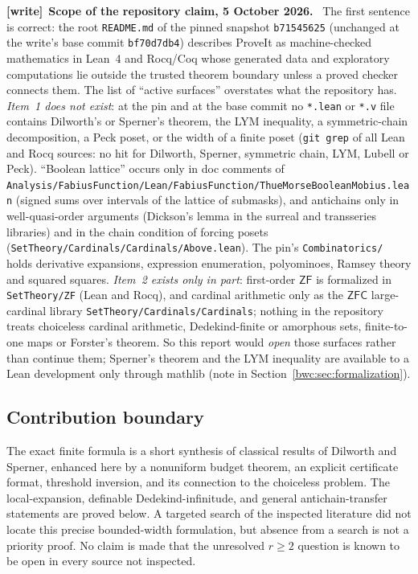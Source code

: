 \documentclass[11pt,letterpaper]{article}
\numberwithin{equation}{section}
\theoremstyle{plain}
\theoremstyle{definition}
\theoremstyle{remark}
\newcommand{\ZF}{\mathsf{ZF}}
\newcommand{\ZFC}{\mathsf{ZFC}}
\newcommand{\file}[1]{\nolinkurl{#1}}
\newenvironment{writenote}[1][]{\par\smallskip\begingroup\small
 \noindent\textbf{[write]}\if\relax\detokenize{#1}\relax\else~\textbf{#1.}\fi\ }%
 {\par\endgroup\smallskip}
\begin{document}
\begin{writenote}[Scope of the repository claim, 5 October 2026]
The first sentence is correct: the root \file{README.md} of the pinned
snapshot \file{b71545625} (unchanged at the write's base commit
\file{bf70d7db4}) describes ProveIt as machine-checked mathematics in Lean~4
and Rocq/Coq whose generated data and exploratory computations lie outside the
trusted theorem boundary unless a proved checker connects them. The list of
``active surfaces'' overstates what the repository has. \emph{Item~1 does not
exist}: at the pin and at the base commit no \file{*.lean} or \file{*.v} file
contains Dilworth's or Sperner's theorem, the LYM inequality, a
symmetric-chain decomposition, a Peck poset, or the width of a finite poset
(\texttt{git grep} of all Lean and Rocq sources: no hit for Dilworth, Sperner,
symmetric chain, LYM, Lubell or Peck). ``Boolean lattice'' occurs only in doc
comments of \file{Analysis/FabiusFunction/Lean/FabiusFunction/ThueMorseBooleanMobius.lean}
(signed sums over intervals of the lattice of submasks), and antichains only
in well-quasi-order arguments (Dickson's lemma in the surreal and transseries
libraries) and in the chain condition of forcing posets
(\file{SetTheory/Cardinals/Cardinals/Above.lean}). The pin's
\file{Combinatorics/} holds derivative expansions, expression enumeration,
polyominoes, Ramsey theory and squared squares. \emph{Item~2 exists only in
part}: first-order $\ZF$ is formalized in \file{SetTheory/ZF} (Lean and Rocq),
and cardinal arithmetic only as the $\ZFC$ large-cardinal library
\file{SetTheory/Cardinals/Cardinals}; nothing in the repository treats
choiceless cardinal arithmetic, Dedekind-finite or amorphous sets,
finite-to-one maps or Forster's theorem. So this report would \emph{open}
those surfaces rather than continue them; Sperner's theorem and the LYM
inequality are available to a Lean development only through mathlib (note in
Section~\ref{bwc:sec:formalization}).
\end{writenote}

\subsection{Contribution boundary}
The exact finite formula is a short synthesis of classical results of
Dilworth and Sperner, enhanced here by a nonuniform budget theorem, an
explicit certificate format, threshold inversion, and its connection to the
choiceless problem.  The local-expansion, definable Dedekind-infinitude, and
general antichain-transfer statements are proved below.  A targeted search of
the inspected literature did not locate this precise bounded-width
formulation, but absence from a search is not a priority proof.  No claim is
made that the unresolved $r\geq2$ question is known to be open in every
source not inspected.
\end{document}
